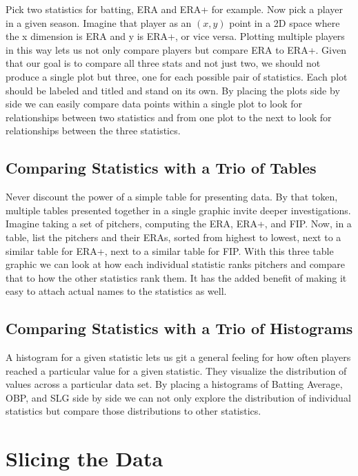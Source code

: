 \documentclass[10pt]{article}
\begin{document}
Pick two statistics for batting, ERA and ERA+ for example.  Now pick a player in a given season.  Imagine that player as an \( (x,y) \) point in a 2D space where the x dimension is ERA and y is ERA+, or vice versa. Plotting multiple players in this way lets us not only compare players but compare ERA to ERA+. Given that our goal is to compare all three stats and not just two, we should not produce a single plot but three, one for each possible pair of statistics. Each plot should be labeled and titled and stand on its own. By placing the plots side by side we can easily compare data points within a single plot to look for relationships between two statistics and from one plot to the next to look for relationships between the three statistics.

\subsection*{Comparing Statistics with a Trio of Tables}

Never discount the power of a simple table for presenting data. By that token, multiple tables presented together in a single graphic invite deeper investigations.  Imagine taking a set of pitchers, computing the ERA, ERA+, and FIP. Now, in a table, list the pitchers and their ERAs, sorted from highest to lowest, next to a similar table for ERA+, next to a similar table for FIP. With this three table graphic we can look at how each individual statistic ranks pitchers and compare that to how the other statistics rank them. It has the added benefit of making it easy to attach actual names to the statistics as well.

\subsection*{Comparing Statistics with a Trio of Histograms}

A histogram for a given statistic lets us git a general feeling for how often players reached a particular value for a given statistic.  They visualize the distribution of values across a particular data set. By placing a histograms of Batting Average, OBP, and SLG side by side we can not only explore the distribution of individual statistics but compare those distributions to other statistics.

\section*{Slicing the Data}
\end{document}

